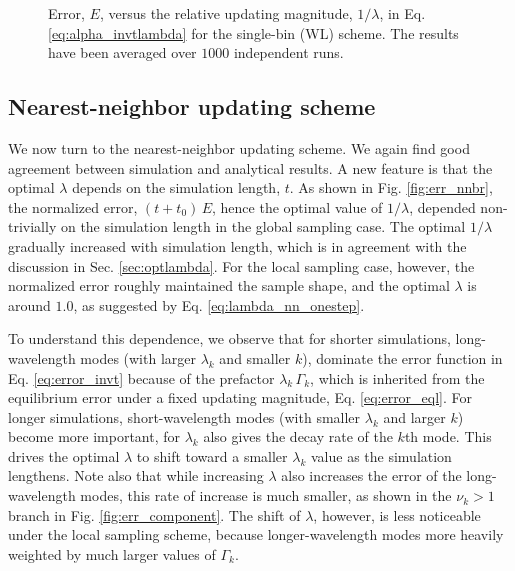 \documentclass[reprint, floatfix]{revtex4-1}
\newcommand{\Err}{E}
\begin{document}
\begin{figure}[h]
\begin{center}
  \caption{
    \label{fig:err_singlebin}
    Error, $E$, versus the
    relative updating magnitude,
    $1/\lambda$,
    in Eq. \eqref{eq:alpha_invtlambda}
    for the single-bin (WL) scheme.
    The results have been averaged over $1000$ independent runs.
  }
\end{center}
\end{figure}



\subsection{Nearest-neighbor updating scheme}


We now turn to the nearest-neighbor updating scheme.
%
We again find good agreement
between simulation and analytical results.
%
A new feature is that the optimal $\lambda$
depends on the simulation length, $t$.
%
As shown in Fig. \ref{fig:err_nnbr},
the normalized error, $(t + t_0) \, \Err$,
hence the optimal value of $1/\lambda$,
depended non-trivially on the simulation length
in the global sampling case.
%
The optimal $1/\lambda$ gradually increased
with simulation length, which is in agreement with
the discussion in Sec. \ref{sec:optlambda}.
%
For the local sampling case, however,
the normalized error roughly maintained the sample shape,
and the optimal $\lambda$ is around $1.0$,
as suggested by Eq. \eqref{eq:lambda_nn_onestep}.



To understand this dependence,
we observe that for shorter simulations,
long-wavelength modes
(with larger $\lambda_k$ and smaller $k$),
dominate the error function in Eq. \eqref{eq:error_invt}
because of the prefactor $\lambda_k \, \Gamma_k$,
which is inherited from
the equilibrium error under a fixed updating magnitude,
Eq. \eqref{eq:error_eql}.
%
For longer simulations,
short-wavelength modes
(with smaller $\lambda_k$ and larger $k$)
become more important,
for $\lambda_k$ also gives the decay rate
of the $k$th mode.
%
This drives the optimal $\lambda$ to shift toward
a smaller $\lambda_k$ value
as the simulation lengthens.
%
Note also that while increasing $\lambda$
also increases the error of the long-wavelength modes,
this rate of increase is much smaller,
as shown in the $\nu_k > 1$ branch
in Fig. \ref{fig:err_component}.
%
The shift of $\lambda$, however, is less noticeable
under the local sampling scheme,
because longer-wavelength modes more heavily
weighted by much larger values of $\Gamma_k$.
\end{document}
